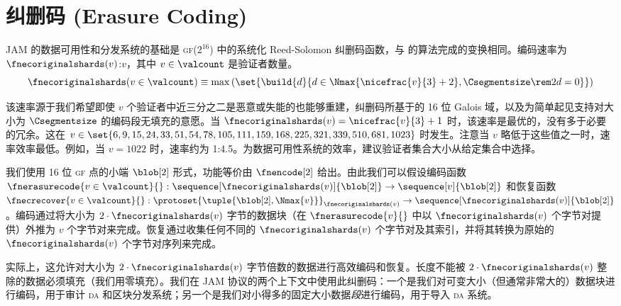 \section{纠删码 (Erasure Coding)}
\label{sec:erasurecoding}

\newcommand{\join}{\text{join}}
\newcommand{\spl}[1]{\text{split}_{#1}}

JAM 的数据可用性和分发系统的基础是 \textsc{gf}($2^{16}$) 中的系统化 Reed-Solomon 纠删码函数，与 \cite{lin2014novel} 的算法完成的变换相同。编码速率为 $\fnecoriginalshards(v)$:$v$，其中 $v \in \valcount$ 是验证者数量。
\begin{equation}\label{eq:ecoriginalshards}
  \fnecoriginalshards(v \in \valcount) \equiv \max\left(\set{\build{d}{d \in \Nmax{\nicefrac{v}{3} + 2}, \Csegmentsize \rem 2d = 0}}\right)
\end{equation}

该速率源于我们希望即使 $v$ 个验证者中近三分之二是恶意或失能的也能够重建，纠删码所基于的 16 位 Galois 域，以及为简单起见支持对大小为 $\Csegmentsize$ 的编码段无填充的意愿。当 $\fnecoriginalshards(v) = \nicefrac{v}{3} + 1$ 时，该速率是最优的，\ie 没有多于必要的冗余。这在 $v \in \set{6, 9, 15, 24, 33, 51, 54, 78, 105, 111, 159, 168, 225, 321, 339, 510, 681, 1023}$ 时发生。注意当 $v$ 略低于这些值之一时，速率效率最低。例如，当 $v = 1022$ 时，速率约为 1:4.5。为数据可用性系统的效率，建议验证者集合大小从给定集合中选择。

我们使用 16 位 \textsc{gf} 点的小端 $\blob[2]$ 形式，功能等价由 $\fnencode[2]$ 给出。由此我们可以假设编码函数 $\fnerasurecode{v \in \valcount}{}: \sequence[\fnecoriginalshards(v)]{\blob[2]} \to \sequence[v]{\blob[2]}$ 和恢复函数 $\fnecrecover{v \in \valcount}{}: \protoset{\tuple{\blob[2], \Nmax{v}}}_{\fnecoriginalshards(v)} \to \sequence[\fnecoriginalshards(v)]{\blob[2]}$。编码通过将大小为 $2 \cdot \fnecoriginalshards(v)$ 字节的数据块（在 $\fnerasurecode{v}{}$ 中以 $\fnecoriginalshards(v)$ 个字节对提供）外推为 $v$ 个字节对来完成。恢复通过收集任何不同的 $\fnecoriginalshards(v)$ 个字节对及其索引，并将其转换为原始的 $\fnecoriginalshards(v)$ 个字节对序列来完成。

实际上，这允许对大小为 $2 \cdot \fnecoriginalshards(v)$ 字节倍数的数据进行高效编码和恢复。长度不能被 $2 \cdot \fnecoriginalshards(v)$ 整除的数据必须填充（我们用零填充）。我们在 JAM 协议的两个上下文中使用此纠删码：一个是我们对可变大小（但通常非常大的）数据块进行编码，用于审计 \textsc{da} 和区块分发系统；另一个是我们对小得多的固定大小数据\emph{段}进行编码，用于导入 \textsc{da} 系统。

